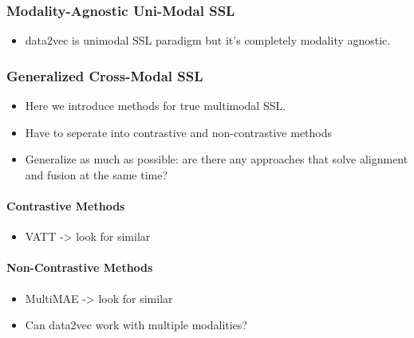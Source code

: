 \documentclass[
]{krantz}
\providecommand{\tightlist}{%
  \setlength{\itemsep}{0pt}\setlength{\parskip}{0pt}}
\begin{document}
\hypertarget{modality-agnostic-uni-modal-ssl}{%
\subsubsection{Modality-Agnostic Uni-Modal SSL}\label{modality-agnostic-uni-modal-ssl}}

\begin{itemize}
\tightlist
\item
  data2vec is unimodal SSL paradigm but it's completely modality agnostic.
\end{itemize}

\hypertarget{generalized-cross-modal-ssl}{%
\subsubsection{Generalized Cross-Modal SSL}\label{generalized-cross-modal-ssl}}

\begin{itemize}
\tightlist
\item
  Here we introduce methods for true multimodal SSL.
\item
  Have to seperate into contrastive and non-contrastive methods
\item
  Generalize as much as possible: are there any approaches that solve alignment and fusion at the same time?
\end{itemize}

\hypertarget{contrastive-methods}{%
\paragraph{Contrastive Methods}\label{contrastive-methods}}

\begin{itemize}
\tightlist
\item
  VATT -\textgreater{} look for similar
\end{itemize}

\hypertarget{non-contrastive-methods}{%
\paragraph{Non-Contrastive Methods}\label{non-contrastive-methods}}

\begin{itemize}
\tightlist
\item
  MultiMAE -\textgreater{} look for similar
\item
  Can data2vec work with multiple modalities?
\end{itemize}
\end{document}
